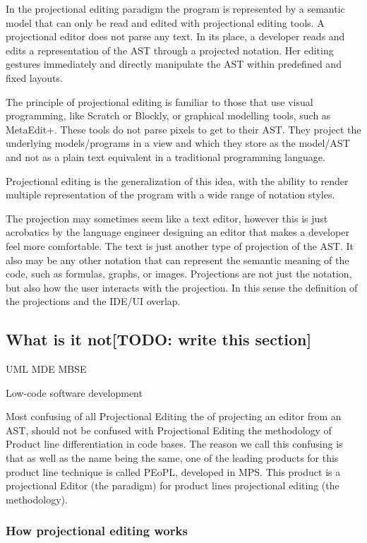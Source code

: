 In the projectional editing paradigm the program is represented by a semantic model that can only be read and edited with projectional editing tools. 
A projectional editor does not parse any text.
In its place, a developer reads and edits a representation of the AST through a projected notation.
Her editing gestures immediately and directly manipulate the AST within predefined and fixed layouts.

The principle of projectional editing is familiar to those that use visual programming, like Scratch or Blockly, or graphical modelling tools, such as MetaEdit+.
These tools do not parse pixels to get to their AST. 
They project the underlying models/programs in a view and which they store as the model/AST and not as a plain text equivalent in a traditional programming language.

Projectional editing is the generalization of this idea, with the ability to render multiple representation of the program with a wide range of notation styles.

The projection may sometimes seem like a text editor, however this is just acrobatics by the language engineer designing an editor that makes a developer feel more comfortable. 
The text is just another type of projection of the AST.
It also may be any other notation that can represent the semantic meaning of the code, such as formulas, graphs, or images.
Projections are not just the notation, but also how the user interacts with the projection.
In this sense the definition of the projections and the IDE/UI overlap.

\subsection{What is it not[TODO: write this section]}

UML 
MDE
MBSE

Low-code software development

Most confusing of all Projectional Editing the  of projecting an editor from an AST, should not be confused with Projectional Editing the methodology of Product line differentiation in code bases.
The reason we call this confusing is that as well as the name being the same, one of the leading products for this product line technique is called PEoPL, developed in MPS.
This product is a projectional Editor (the paradigm) for product lines projectional editing (the methodology).

\subsubsection{How projectional editing works}

